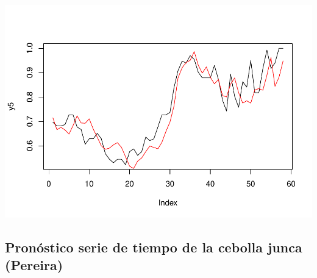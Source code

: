 \documentclass[
]{book}
\begin{document}
\includegraphics{bookdown-demo_files/figure-latex/unnamed-chunk-197-1.pdf}

\hypertarget{pronuxf3stico-serie-de-tiempo-de-la-cebolla-junca-pereira}{%
\subsection{Pronóstico serie de tiempo de la cebolla junca (Pereira)}\label{pronuxf3stico-serie-de-tiempo-de-la-cebolla-junca-pereira}}
\end{document}
